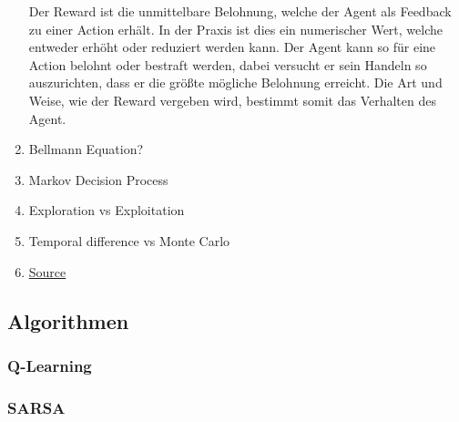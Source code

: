 \begin{enumerate}
    Der Reward ist die unmittelbare Belohnung, welche der Agent als Feedback zu einer Action erhält. In der Praxis ist dies ein numerischer Wert, welche entweder erhöht oder reduziert werden kann. Der Agent kann so für eine Action belohnt oder bestraft werden, dabei versucht er sein Handeln so auszurichten, dass er die größte mögliche Belohnung erreicht. Die Art und Weise, wie der Reward vergeben wird, bestimmt somit das Verhalten des Agent.
    \item Bellmann Equation?
    \item Markov Decision Process
    \item Exploration vs Exploitation
    \item Temporal difference vs Monte Carlo
    \item \href{https://blog.floydhub.com/an-introduction-to-q-learning-reinforcement-learning/}{Source} 
\end{enumerate}

\subsection{Algorithmen}

\subsubsection{Q-Learning}

\subsubsection{SARSA}

